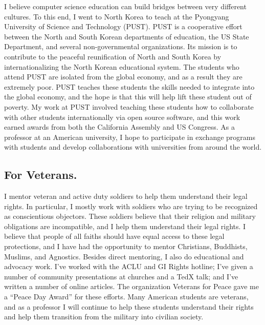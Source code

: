 \documentclass[12pt]{article}
\begin{document}
I believe computer science education can build bridges between very different cultures.
To this end, I went to North Korea to teach at the Pyongyang University of Science and Technology (PUST).
PUST is a cooperative effort between the North and South Korean departments of education, the US State Department, and several non-governmental organizations.
Its mission is to contribute to the peaceful reunification of North and South Korea by internationalizing the North Korean educational system.
The students who attend PUST are isolated from the global economy,
and as a result they are extremely poor.
PUST teaches these students the skills needed to integrate into the global economy,
and the hope is that this will help lift these student out of poverty.
My work at PUST involved teaching these students how to collaborate with other students internationally via open source software,
and this work earned awards from both the California Assembly and US Congress.
As a professor at an American university,
I hope to participate in exchange programs with students and develop collaborations with universities from around the world.


\vspace{-0.15in}
\subsection*{For Veterans.}

I mentor veteran and active duty soldiers to help them understand their legal rights.
In particular, I mostly work with soldiers who are trying to be recognized as conscientious objectors.
These soldiers believe that their religion and military obligations are incompatible,
and I help them understand their legal rights.
I believe that people of all faiths should have equal access to these legal protections,
and I have had the opportunity to mentor Christians, Buddhists, Muslims, and Agnostics.
Besides direct mentoring, I also do educational and advocacy work.
I've worked with the ACLU and GI Rights hotline;
I've given a number of community presentations at churches and a TedX talk;
and I've written a number of online articles.
The organization Veterans for Peace gave me a ``Peace Day Award'' for these efforts.
Many American students are veterans,
and as a professor I will continue to help these students understand their rights and help them transition from the military into civilian society.

\end{document}
